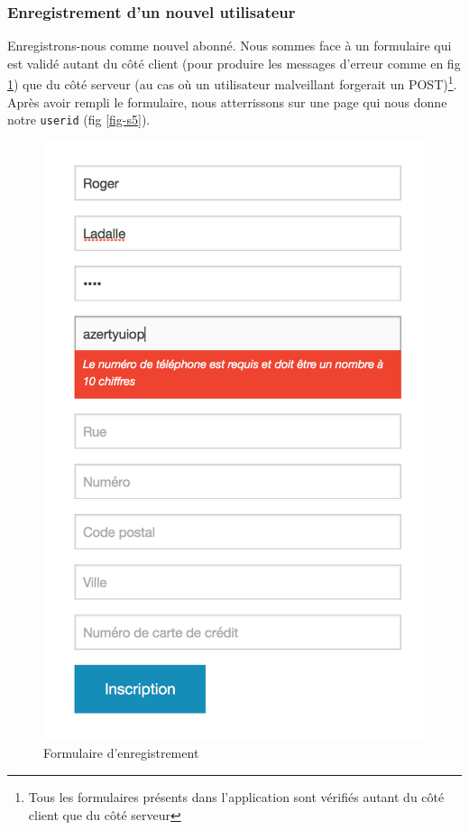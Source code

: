 \documentclass[a4paper]{article}
\begin{document}
    \subsubsection{Enregistrement d'un nouvel utilisateur}
    Enregistrons-nous comme nouvel abonné. Nous sommes face à un formulaire qui est validé autant du côté client (pour produire les messages d'erreur comme en fig \ref{fig-s4}) que du côté serveur (au cas où un utilisateur malveillant forgerait un POST)\footnote{Tous les formulaires présents dans l'application sont vérifiés autant du côté client que du côté serveur}. Après avoir rempli le formulaire, nous atterrissons sur une page qui nous donne notre \texttt{userid} (fig \ref{fig-s5}). 
    
    \begin{figure}
    \begin{center}
	\includegraphics[width=\textwidth/2]{s4.png}
    \end{center}
    \caption{Formulaire d'enregistrement}
    \label{fig-s4}
	\end{figure}
    
\end{document}
